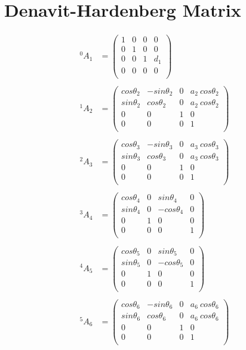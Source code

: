\documentclass[12pt]{article}
\begin{document}
\section{Denavit-Hardenberg Matrix}
\begin{align*}
{}^0 A_1 &=
\begin{pmatrix}
    1 & 0 & 0 & 0 \\
    0 & 1 & 0 & 0 \\
    0 & 0 & 1 & d_1 \\
    0 & 0 & 0 & 0 \\
\end{pmatrix} \\
\\
{}^1 A_2 &=
\begin{pmatrix}
    cos\theta_2 & -sin\theta_2 & 0 & a_2~cos\theta_2 \\
    sin\theta_2 & cos\theta_2 & 0 & a_2~cos\theta_2 \\
    0 & 0 & 1 & 0 \\
    0 & 0 & 0 & 1 \\
\end{pmatrix} \\
\\
{}^2 A_3 &=
\begin{pmatrix}
    cos\theta_3 & -sin\theta_3 & 0 & a_3~cos\theta_3 \\
    sin\theta_3 & cos\theta_3 & 0 & a_3~cos\theta_3 \\
    0 & 0 & 1 & 0 \\
    0 & 0 & 0 & 1 \\
\end{pmatrix} \\
\\
{}^3 A_4 &=
\begin{pmatrix}
    cos\theta_4 & 0 & sin\theta_4 & 0 \\
    sin\theta_4 & 0 & -cos\theta_4 & 0 \\
    0 & 1 & 0 & 0 \\
    0 & 0 & 0 & 1 \\
\end{pmatrix} \\
\\
{}^4 A_5 &=
\begin{pmatrix}
    cos\theta_5 & 0 & sin\theta_5 & 0 \\
    sin\theta_5 & 0 & -cos\theta_5 & 0 \\
    0 & 1 & 0 & 0 \\
    0 & 0 & 0 & 1 \\
\end{pmatrix} \\
\\
{}^5 A_6 &=
\begin{pmatrix}
    cos\theta_6 & -sin\theta_6 & 0 & a_6~cos\theta_6 \\
    sin\theta_6 & cos\theta_6 & 0 & a_6~cos\theta_6 \\
    0 & 0 & 1 & 0 \\
    0 & 0 & 0 & 1 \\
\end{pmatrix} \\
\end{align*}
\end{document}
